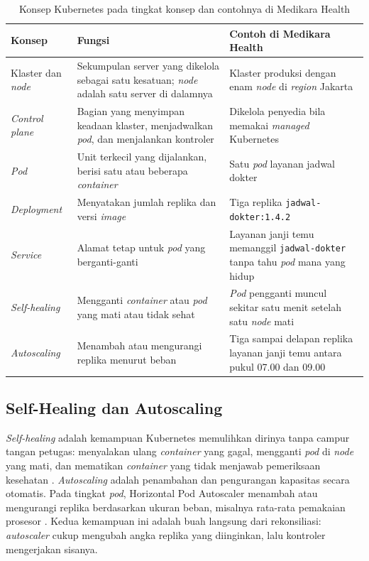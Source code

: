 \begin{table}[!htb]
  \centering
  \caption{Konsep Kubernetes pada tingkat konsep dan contohnya di Medikara Health}
  \label{tab:ch08-konsep-k8s}
  \footnotesize
  \begin{tabularx}{\textwidth}{>{\raggedright\arraybackslash}p{2.3cm}
      >{\raggedright\arraybackslash}X >{\raggedright\arraybackslash}X}
    \hline
    \textbf{Konsep} & \textbf{Fungsi} & \textbf{Contoh di Medikara Health} \\ \hline
    Klaster dan \textit{node} & Sekumpulan server yang dikelola sebagai satu kesatuan;
      \textit{node} adalah satu server di dalamnya & Klaster produksi dengan enam \textit{node} di
      \textit{region} Jakarta \\ \hline
    \textit{Control plane} & Bagian yang menyimpan keadaan klaster, menjadwalkan \textit{pod}, dan
      menjalankan kontroler & Dikelola penyedia bila memakai \textit{managed} Kubernetes \\ \hline
    \textit{Pod} & Unit terkecil yang dijalankan, berisi satu atau beberapa \textit{container} &
      Satu \textit{pod} layanan jadwal dokter \\ \hline
    \textit{Deployment} & Menyatakan jumlah replika dan versi \textit{image} & Tiga replika
      \texttt{jadwal-dokter:1.4.2} \\ \hline
    \textit{Service} & Alamat tetap untuk \textit{pod} yang berganti-ganti & Layanan janji temu
      memanggil \texttt{jadwal-dokter} tanpa tahu \textit{pod} mana yang hidup \\ \hline
    \textit{Self-healing} & Mengganti \textit{container} atau \textit{pod} yang mati atau tidak
      sehat & \textit{Pod} pengganti muncul sekitar satu menit setelah satu \textit{node} mati \\ \hline
    \textit{Autoscaling} & Menambah atau mengurangi replika menurut beban & Tiga sampai delapan
      replika layanan janji temu antara pukul 07.00 dan 09.00 \\ \hline
  \end{tabularx}
\end{table}

\subsection{Self-Healing dan Autoscaling}

\textit{Self-healing} adalah kemampuan Kubernetes memulihkan dirinya tanpa campur tangan petugas:
menyalakan ulang \textit{container} yang gagal, mengganti \textit{pod} di \textit{node} yang mati,
dan mematikan \textit{container} yang tidak menjawab pemeriksaan kesehatan
\cite{c08-k8s-overview}. \textit{Autoscaling} adalah penambahan dan pengurangan kapasitas secara
otomatis. Pada tingkat \textit{pod}, Horizontal Pod Autoscaler menambah atau mengurangi replika
berdasarkan ukuran beban, misalnya rata-rata pemakaian prosesor \cite{c08-k8s-hpa}. Kedua
kemampuan ini adalah buah langsung dari rekonsiliasi: \textit{autoscaler} cukup mengubah angka
replika yang diinginkan, lalu kontroler mengerjakan sisanya.

